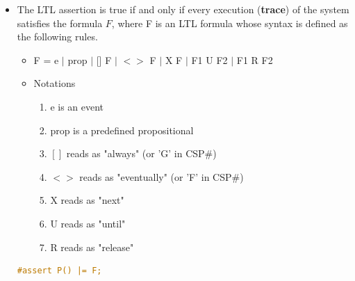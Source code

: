 \documentclass[10pt, landscape]{article}
\begin{document}
\begin{multicols*}{3}
\begin{itemize}
\begin{center}
    \end{center}
    \item The LTL assertion is true if and only if every execution (\textbf{trace}) of the system satisfies the formula $F$, where F is an LTL formula whose syntax is defined as the following rules.
    \begin{itemize}
      \item F = e $\mid$ prop $\mid$ [] F $\mid$ $<>$ F $\mid$ X F $\mid$ F1 U F2 $\mid$ F1 R F2
      \item Notations
      \begin{enumerate}
          \item e is an event
          \item prop is a predefined propositional
          \item $[]$ reads as "always" (or 'G' in CSP\#)
          \item $<>$ reads as "eventually" (or 'F' in CSP\#)
          \item X reads as "next"
          \item U reads as "until"
          \item R reads as "release" 
      \end{enumerate} 
    \end{itemize}
\begin{lstlisting}[language=C]
#assert P() |= F;
\end{lstlisting}
  \end{itemize}


\end{multicols*}
\end{document}
